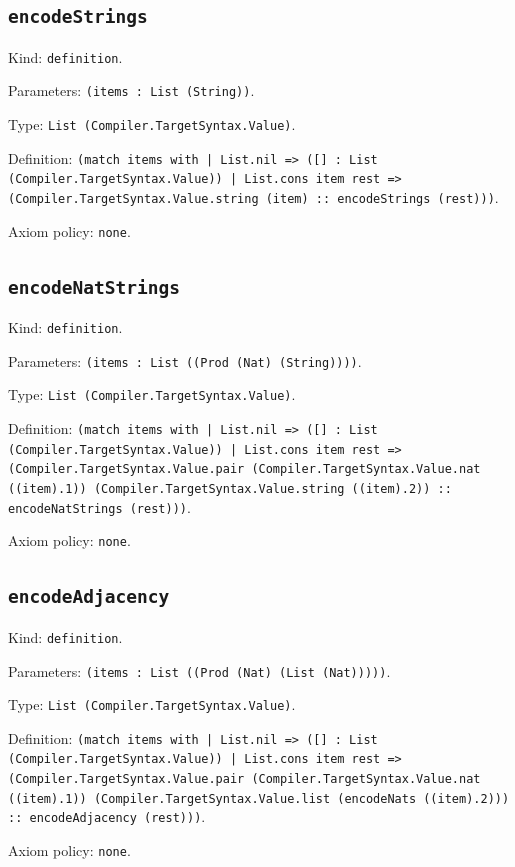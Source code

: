 \documentclass[11pt]{article}
\begin{document}
\subsection*{\texttt{encodeStrings}}
\noindent Kind: \texttt{definition}.\par
\noindent Parameters: \texttt{(items : List (String))}.\par
\noindent Type: \texttt{List (Compiler.TargetSyntax.Value)}.\par
\noindent Definition: \texttt{(match items with | List.nil => ([] : List (Compiler.TargetSyntax.Value)) | List.cons item rest => (Compiler.TargetSyntax.Value.string (item) :: encodeStrings (rest)))}.\par
\noindent Axiom policy: \texttt{none}.\par
\subsection*{\texttt{encodeNatStrings}}
\noindent Kind: \texttt{definition}.\par
\noindent Parameters: \texttt{(items : List ((Prod (Nat) (String))))}.\par
\noindent Type: \texttt{List (Compiler.TargetSyntax.Value)}.\par
\noindent Definition: \texttt{(match items with | List.nil => ([] : List (Compiler.TargetSyntax.Value)) | List.cons item rest => (Compiler.TargetSyntax.Value.pair (Compiler.TargetSyntax.Value.nat ((item).1)) (Compiler.TargetSyntax.Value.string ((item).2)) :: encodeNatStrings (rest)))}.\par
\noindent Axiom policy: \texttt{none}.\par
\subsection*{\texttt{encodeAdjacency}}
\noindent Kind: \texttt{definition}.\par
\noindent Parameters: \texttt{(items : List ((Prod (Nat) (List (Nat)))))}.\par
\noindent Type: \texttt{List (Compiler.TargetSyntax.Value)}.\par
\noindent Definition: \texttt{(match items with | List.nil => ([] : List (Compiler.TargetSyntax.Value)) | List.cons item rest => (Compiler.TargetSyntax.Value.pair (Compiler.TargetSyntax.Value.nat ((item).1)) (Compiler.TargetSyntax.Value.list (encodeNats ((item).2))) :: encodeAdjacency (rest)))}.\par
\noindent Axiom policy: \texttt{none}.\par
\end{document}
